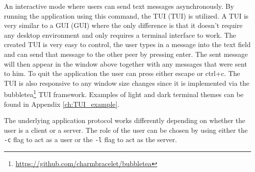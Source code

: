 An interactive mode where users can send text messages asynchronously. By running the application using this command, the TUI (\acl{TUI}) is utilized. A TUI is very similar to a GUI (\acl{GUI}) where the only difference is that it doesn't require any desktop environment and only requires a terminal interface to work. The created TUI is very easy to control, the user types in a message into the text field and can send that message to the other peer by pressing enter. The sent message will then appear in the window above together with any messages that were sent to him. To quit the application the user can press either escape or ctrl+c. The TUI is also responsive to any window size changes since it is implemented via the bubbletea\footnote{\url{https://github.com/charmbracelet/bubbletea}} TUI framework. Examples of light and dark terminal themes can be found in Appendix \ref{ch:TUI_example}.

The underlying application protocol works differently depending on whether the user is a client or a server. The role of the user can be chosen by using either the \texttt{-c} flag to act as a user or the \texttt{-l} flag to act as the server.
